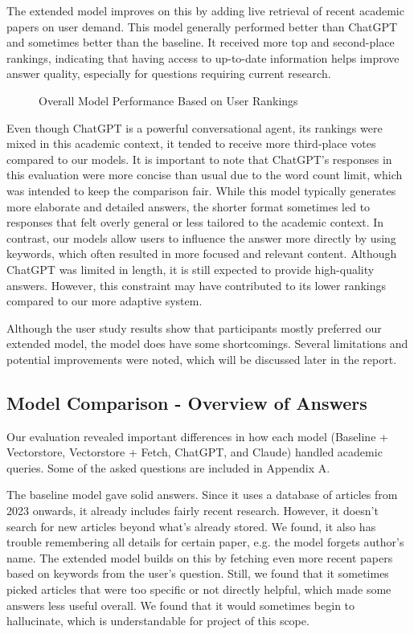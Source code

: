 \documentclass[fleqn,moreauthors,10pt]{ds_report}
\begin{document}
The extended model improves on this by adding live retrieval of recent academic papers on user demand. This model generally performed better than ChatGPT and sometimes better than the baseline. It received more top and second-place rankings, indicating that having access to up-to-date information helps improve answer quality, especially for questions requiring current research.


\begin{figure}[htbp]
    \centering
    
    \caption{Overall Model Performance Based on User Rankings}
    \label{fig:summary}
\end{figure}

Even though ChatGPT is a powerful conversational agent, its rankings were mixed in this academic context, it tended to receive more third-place votes compared to our models. It is important to note that ChatGPT’s responses in this evaluation were more concise than usual due to the word count limit, which was intended to keep the comparison fair. While this model typically generates more elaborate and detailed answers, the shorter format sometimes led to responses that felt overly general or less tailored to the academic context. In contrast, our models allow users to influence the answer more directly by using keywords, which often resulted in more focused and relevant content. Although ChatGPT was limited in length, it is still expected to provide high-quality answers. However, this constraint may have contributed to its lower rankings compared to our more adaptive system.

Although the user study results show that participants mostly preferred our extended model, the model does have some shortcomings. Several limitations and potential improvements were noted, which will be discussed later in the report.

\subsection*{Model Comparison - Overview of Answers}

Our evaluation revealed important differences in how each model (Baseline + Vectorstore, Vectorstore + Fetch, ChatGPT, and Claude) handled academic queries. Some of the asked questions are included in Appendix A.

The baseline model gave solid answers. Since it uses a  database of articles from 2023 onwards, it already includes fairly recent research. However, it doesn’t search for new articles beyond what’s already stored. We found, it also has trouble remembering all details for certain paper, e.g. the model forgets author's name. The extended model builds on this by fetching even more recent papers based on keywords from the user's question. Still, we found that it sometimes picked articles that were too specific or not directly helpful, which made some answers less useful overall. We found that it would sometimes begin to hallucinate, which is understandable for project of this scope.
\end{document}
